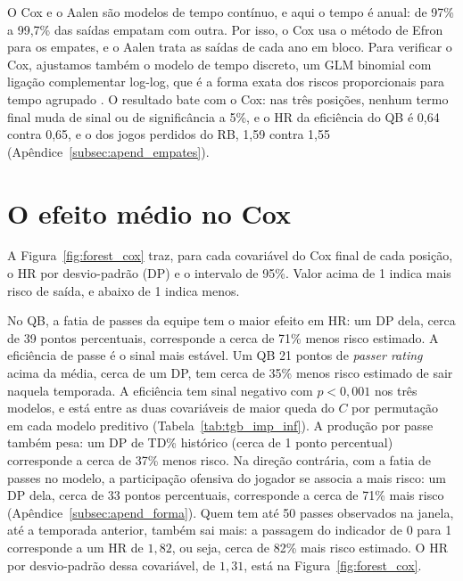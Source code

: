 O Cox e o Aalen são modelos de tempo contínuo, e aqui o tempo é anual: de 97\% a 99,7\% das saídas empatam com outra. Por isso, o Cox usa o método de Efron para os empates, e o Aalen trata as saídas de cada ano em bloco. Para verificar o Cox, ajustamos também o modelo de tempo discreto, um GLM binomial com ligação complementar log-log, que é a forma exata dos riscos proporcionais para tempo agrupado \citep{prentice1978}. O resultado bate com o Cox: nas três posições, nenhum termo final muda de sinal ou de significância a 5\%, e o HR da eficiência do QB é 0,64 contra 0,65, e o dos jogos perdidos do RB, 1,59 contra 1,55 (Apêndice~\ref{subsec:apend_empates}).

\section{O efeito médio no Cox}
\label{sec:res_posicoes}

A Figura~\ref{fig:forest_cox} traz, para cada covariável do Cox final de cada posição, o HR por desvio-padrão (DP) e o intervalo de 95\%. Valor acima de 1 indica mais risco de saída, e abaixo de 1 indica menos.

No QB, a fatia de passes da equipe tem o maior efeito em HR: um DP dela, cerca de 39 pontos percentuais, corresponde a cerca de 71\% menos risco estimado. A eficiência de passe é o sinal mais estável. Um QB 21 pontos de \textit{passer rating} acima da média, cerca de um DP, tem cerca de 35\% menos risco estimado de sair naquela temporada. A eficiência tem sinal negativo com $p<0{,}001$ nos três modelos, e está entre as duas covariáveis de maior queda do $C$ por permutação em cada modelo preditivo (Tabela~\ref{tab:tgb_imp_inf}). A produção por passe também pesa: um DP de TD\% histórico (cerca de 1 ponto percentual) corresponde a cerca de 37\% menos risco. Na direção contrária, com a fatia de passes no modelo, a participação ofensiva do jogador se associa a mais risco: um DP dela, cerca de 33 pontos percentuais, corresponde a cerca de 71\% mais risco (Apêndice~\ref{subsec:apend_forma}). Quem tem até 50 passes observados na janela, até a temporada anterior, também sai mais: a passagem do indicador de 0 para 1 corresponde a um HR de $1{,}82$, ou seja, cerca de 82\% mais risco estimado. O HR por desvio-padrão dessa covariável, de $1{,}31$, está na Figura~\ref{fig:forest_cox}.

